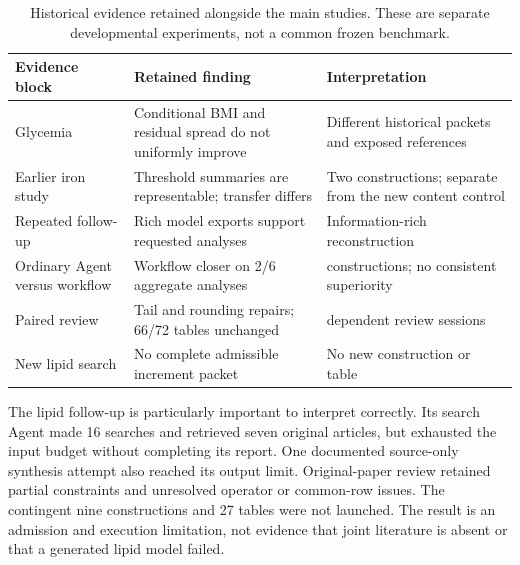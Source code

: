 \documentclass[sigconf,anonymous,nonacm]{acmart}
\begin{document}
\begin{table}[H]

\caption{Historical evidence retained alongside the main studies. These are separate developmental experiments, not a common frozen benchmark.}

\label{tab:7}

\centering\small

\renewcommand{\arraystretch}{1.12}

\begin{tabularx}{\linewidth}{@{}>{\raggedright\arraybackslash}X>{\raggedright\arraybackslash}X>{\raggedright\arraybackslash}X@{}}

\toprule

Evidence block & Retained finding & Interpretation \\

\midrule

Glycemia & Conditional BMI and residual spread do not uniformly improve & Different historical packets and exposed references \\

Earlier iron study & Threshold summaries are representable; transfer differs & Two constructions; separate from the new content control \\

Repeated follow-up & Rich model exports support requested analyses & Information-rich reconstruction \\

Ordinary Agent versus workflow & Workflow closer on 2/\allowbreak{}6 aggregate analyses & 12 constructions; no consistent superiority \\

Paired review & Tail and rounding repairs; 66/\allowbreak{}72 tables unchanged & 24 dependent review sessions \\

New lipid search & No complete admissible increment packet & No new construction or table \\

\bottomrule

\end{tabularx}

\end{table}

The lipid follow-up is particularly important to interpret correctly. Its search Agent made 16 searches and retrieved seven original articles, but exhausted the input budget without completing its report. One documented source-only synthesis attempt also reached its output limit. Original-paper review retained partial constraints and unresolved operator or common-row issues. The contingent nine constructions and 27 tables were not launched. The result is an admission and execution limitation, not evidence that joint literature is absent or that a generated lipid model failed.
\end{document}
